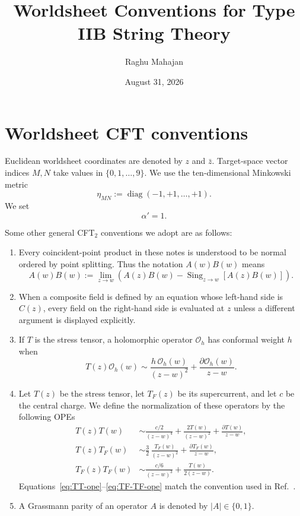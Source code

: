 \documentclass[12pt]{article}
\title{Worldsheet Conventions for Type IIB String Theory}
\author{Raghu Mahajan}
\date{August 31, 2026}
\numberwithin{equation}{section}
\newcommand{\cO}{\mathcal{O}}
\newcommand{\TF}{T_{F}}
\begin{document}
\maketitle

\tableofcontents
\clearpage

\section{Worldsheet CFT conventions}
\label{sec:worldsheet-conventions}

Euclidean worldsheet coordinates are denoted by $z$ and $\bar z$.
Target-space vector indices $M,N$ take values in $\{0,1,\ldots,9\}$.
We use the ten-dimensional Minkowski metric
\begin{equation}
\eta_{MN}:=\operatorname{diag}(-1,+1,\ldots,+1).
\label{eq:minkowski-metric}
\end{equation}
We set
\begin{equation}
\alpha'=1.
\label{eq:alpha-prime}
\end{equation}

Some other general CFT$_2$ conventions we adopt are as follows:
\begin{enumerate}
\item
Every coincident-point product in these notes is understood to be normal
ordered by point splitting.  Thus the notation $A(w)B(w)$ means
\begin{equation}
A(w)B(w)
:=
\lim_{z\to w}
\left(A(z)B(w)-\operatorname{Sing}_{z\to w}[A(z)B(w)]\right).
\label{eq:normal-ordering-definition}
\end{equation}
\item
When a composite field is defined by an equation whose left-hand side is
$C(z)$, every field on the right-hand side is evaluated at $z$ unless a
different argument is displayed explicitly.
\item
If $T$ is the stress tensor, a holomorphic operator $\cO_h$ has conformal
weight $h$ when
\begin{equation}
T(z)\cO_h(w)
\sim
\frac{h\,\cO_h(w)}{(z-w)^2}
+\frac{\partial\cO_h(w)}{z-w}.
\label{eq:conformal-weight-definition}
\end{equation}
\item
Let $T(z)$ be the stress tensor, let $\TF(z)$ be its supercurrent, and let
$c$ be the central charge.
We define the normalization of these operators by the following OPEs
\begin{align}
T(z)T(w)
&\sim
\frac{c/2}{(z-w)^4}
+\frac{2T(w)}{(z-w)^2}
+\frac{\partial T(w)}{z-w},
\label{eq:TT-ope}
\\
T(z)\TF(w)
&\sim
\frac{3}{2}\,
\frac{\TF(w)}{(z-w)^2}
+\frac{\partial\TF(w)}{z-w},
\label{eq:T-TF-ope}
\\
\TF(z)\TF(w)
&\sim
\frac{c/6}{(z-w)^3}
+\frac{T(w)}{2(z-w)}.
\label{eq:TF-TF-ope}
\end{align}
Equations~\eqref{eq:TT-ope}--\eqref{eq:TF-TF-ope} match the convention used
in Ref.~\cite{Barman:2026qzi}.
\item
A Grassmann parity of an operator $A$ is denoted by $|A|\in\{0,1\}$.
\end{enumerate}
\end{document}
